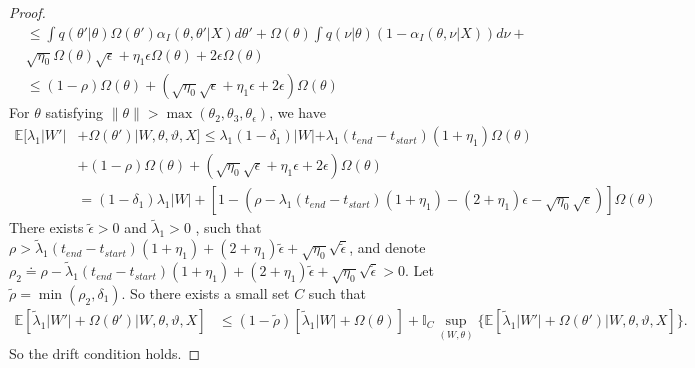\begin{proof}
\begin{align*}
  & \leq \int q(\theta' | \theta) \Omega(\theta')\alpha_I(\theta, \theta'| X) d\theta'  + \Omega(\theta)\int  q(\nu | \theta) (1 - \alpha_I(\theta, \nu | X)) d\nu+ \\
  &\sqrt{\eta_0}\Omega(\theta) \sqrt{\epsilon} +  \eta_1 \epsilon \Omega(\theta) + 2\epsilon \Omega(\theta)\\
  & \leq (1 - \rho) \Omega(\theta) + (\sqrt{\eta_0} \sqrt{\epsilon} +  \eta_1 \epsilon + 2\epsilon) \Omega(\theta)
\end{align*}
For $\theta$ satisfying $ \| \theta \| >\max(\theta_2, \theta_3, \theta_\epsilon)$, we have %
\begin{align*}
\mathbb{E}[\lambda_1 | W'| &+ \Omega(\theta')| W, \theta, \vartheta, X] \le \lambda_1(1 - \delta_1)|W| + \lambda_1 (t_{end} - t_{start}) (1 + \eta_1)\Omega(\theta) \\
&+  (1 - \rho) \Omega(\theta) + (\sqrt{\eta_0} \sqrt{\epsilon} +  \eta_1 \epsilon + 2\epsilon) \Omega(\theta)\\
& = (1 - \delta_1)\lambda_1 |W| + [1 - (\rho - \lambda_1 (t_{end} - t_{start}) (1 + \eta_1) - (2 + \eta_1)\epsilon - \sqrt{\eta_0} \sqrt{\epsilon})]\Omega(\theta)
\end{align*}
There exists  $\tilde{\epsilon} > 0$ and $\tilde{\lambda}_1 >0 $ , such that $\rho >  \tilde{\lambda}_1 (t_{end} - t_{start}) (1 + \eta_1) + (2 + \eta_1)\tilde{\epsilon} + \sqrt{\eta_0} \sqrt{\tilde{\epsilon}}$, and denote $\rho_2  \doteq \rho - \tilde{\lambda}_1 (t_{end} - t_{start}) (1 + \eta_1) + (2 + \eta_1)\tilde{\epsilon} + \sqrt{\eta_0} \sqrt{\tilde{\epsilon}}
 > 0$. Let $\tilde{\rho} = \min(\rho_2, \delta_1)$. So there exists a small set $C$ such that \begin{align*}
\mathbb{E}[\tilde{\lambda}_1 | W'| + \Omega(\theta')| W, \theta, \vartheta, X] &\le (1 - \tilde{\rho}) [\tilde{\lambda}_1 | W| + \Omega(\theta)] +
\mathbb{I}_{C} \sup_{(W, \theta)} \{ \mathbb{E}[\tilde{\lambda}_1 | W'| + \Omega(\theta')| W, \theta, \vartheta, X] \}.
\end{align*}
So the drift condition holds.

\end{proof}
